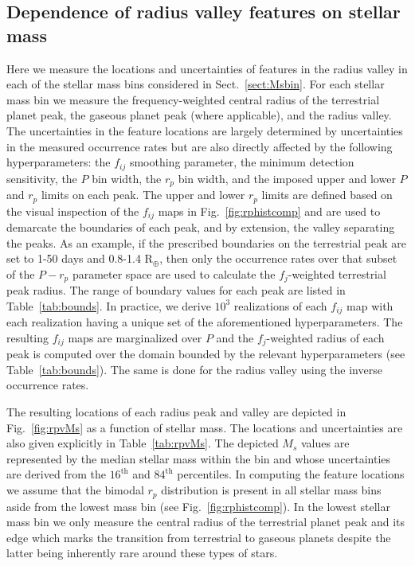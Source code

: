 \documentclass[twocolumn]{emulateapj}
\begin{document}
\subsection{Dependence of radius valley features on stellar mass}
Here we measure the locations and uncertainties of features in the radius valley in each of the stellar
mass bins considered in Sect.~\ref{sect:Msbin}. For each stellar mass bin
we measure the frequency-weighted central radius of the terrestrial planet peak,
the gaseous planet peak (where applicable), and the radius valley. The uncertainties in the feature locations
are largely determined by uncertainties in the measured occurrence rates but are also directly affected by
the following hyperparameters: the $f_{ij}$ smoothing parameter, the minimum detection sensitivity,
the $P$ bin width, the $r_p$ bin width, and the imposed upper and
lower $P$ and $r_p$ limits on each peak. The upper and lower $r_p$ limits are defined based on the visual
inspection of the $f_{ij}$ maps in Fig.~\ref{fig:rphistcomp} and are used to demarcate the
boundaries of each peak, and by extension, the valley separating the peaks.
As an example, if the prescribed boundaries on the terrestrial peak are set to 1-50 days and 0.8-1.4 R$_{\oplus}$,
then only the occurrence rates over that subset of the $P-r_p$ parameter space are used to calculate the
$f_j$-weighted terrestrial peak radius. The range of boundary values for each peak are listed in
Table~\ref{tab:bounds}. In practice, we derive $10^3$ realizations of each $f_{ij}$ map with each realization
having a unique set of the aforementioned hyperparameters.
The resulting $f_{ij}$ maps are marginalized over $P$ and the $f_j$-weighted radius of
each peak is computed over the domain bounded by the relevant hyperparameters (see Table~\ref{tab:bounds}).
The same is done for the radius valley using the inverse occurrence rates.



The resulting locations of each radius peak and valley are depicted in Fig.~\ref{fig:rpvMs} as a function of
stellar mass. The locations and uncertainties are also given explicitly in Table~\ref{tab:rpvMs}.
The depicted $M_s$ values are represented by the median stellar mass within the bin and whose
uncertainties are derived from the $16^{\text{th}}$ and $84^{\text{th}}$ percentiles. In computing the
feature locations we assume that the bimodal $r_p$ distribution is present in all stellar mass bins
aside from the lowest mass bin (see Fig.~\ref{fig:rphistcomp}). In the lowest stellar mass bin we
only measure the central radius of the terrestrial planet peak and its edge which marks the transition from
terrestrial to gaseous planets despite the latter being inherently rare around these types of stars.
\end{document}
